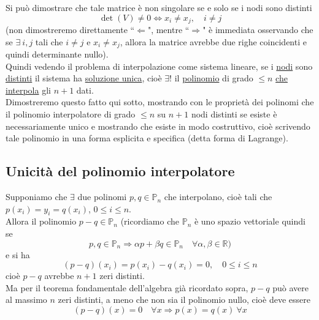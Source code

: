 \documentclass[12pt,headings=optiontohead]{article}
\begin{document}
Si può dimostrare che tale matrice è non singolare se e solo se i nodi sono distinti
\[ \det(V) \ne 0 \iff x_i \ne x_j, \quad i \ne j \]
(non dimostreremo direttamente ``$\Leftarrow$", mentre ``$\Rightarrow$" è immediata osservando che se $\exists \ i,j$ tali che $i\neq j$ e $x_i\neq x_j$, allora la matrice avrebbe due righe coincidenti e quindi determinante nullo).\\ 
Quindi vedendo il problema di interpolazione come sistema lineare, se i \uline{nodi} sono \uline{distinti} il sistema ha \uline{soluzione unica}, cioè \uline{$\exists !$} il \uline{polinomio} di grado $\leq n$ \uline{che interpola} gli $n+1$ dati.\\
Dimostreremo questo fatto qui sotto, mostrando con le proprietà dei polinomi che il polinomio interpolatore di grado $\leq n$ su $n+1$ nodi distinti se esiste è necessariamente unico e mostrando che esiste in modo costruttivo, cioè scrivendo tale polinomio in una forma esplicita e specifica (detta forma di Lagrange).

\subsection{Unicità del polinomio interpolatore}
Supponiamo che $\exists$ due polinomi $p,q \in \mathbb{P}_n$ che interpolano, cioè tali che $p(x_i)=y_i=q(x_i)$, $0\leq i \leq n$.\\ Allora il polinomio $p-q \in \mathbb{P}_n$ (ricordiamo che $\mathbb{P}_n$ è uno spazio vettoriale quindi se
\[ p, q \in \mathbb{P}_n \Rightarrow \alpha p + \beta q \in \mathbb{P}_n \quad \forall \alpha, \beta \in \mathbb{R}) \]
e si ha
\[ (p-q)(x_i) = p(x_i) - q(x_i) = 0, \quad 0 \le i \le n \]
cioè $p-q$ avrebbe $n+1$ zeri distinti.\\
Ma per il teorema fondamentale dell'algebra già ricordato sopra, $p-q$ può avere al massimo $n$ zeri distinti, a meno che non sia il polinomio nullo, cioè deve essere
\[ (p-q)(x) = 0 \quad \forall x \Rightarrow p(x) = q(x) \ \forall x \]
\end{document}
